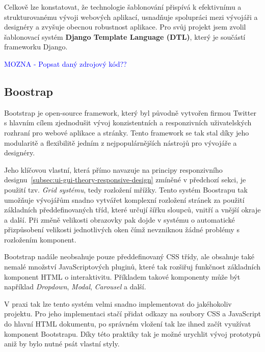 Celkově lze konstatovat, že technologie šablonování přispívá k efektivnímu a strukturovanému vývoji webových aplikací, usnadňuje spolupráci mezi vývojáři a designéry a zvyšuje obecnou robustnost aplikace. Pro svůj projekt jsem zvolil šablonovací systém \textbf{Django Template Language (DTL)}, který je součástí frameworku Django.



\textcolor{blue}{MOZNA - Popsat daný zdrojový kód??}

\subsection{Boostrap}
\label{subsec:dev-technology-bootstrap}
Bootstrap je open-source framework, který byl původně vytvořen firmou Twitter s hlavním cílem zjednodušit vývoj konzistentních a responzivních uživatelských rozhraní pro webové aplikace a stránky. Tento framework se tak stal díky jeho modularitě a flexibilitě jedním z nejpopulárnějších nástrojů pro vývojáře a designéry.

Jeho klíčovou vlastní, která přímo navazuje na principy responzivního designu~\ref{subsec:ui-gui-theory-responsive-design} zmíněné v předchozí sekci, je použití tzv. \textit{Grid systému}, tedy rozložení mřížky. Tento systém Boostrapu tak umožňuje vývojářům snadno vytvářet komplexní rozložení stránek za použití základních předdefinovaných tříd, které určují šířku sloupců, vnitří a vnější okraje a další. Při změně velikosti obrazovky pak dojde v systému o automatické přizpůsobení velikosti jednotlivých oken čímž nevzniknou žádné problémy s rozložením komponent.

Bootstrap nadále neobsahuje pouze předdefinovaný CSS třídy, ale obsahuje také nemalé množství JavaScriptových pluginů, které tak rozšiřuj funkčnost základních komponent HTML o interaktivitu. Příkladem takové komponenty může být například \textit{Dropdown}, \textit{Modal}, \textit{Carousel} a další.

V praxi tak lze tento systém velmi snadno implementovat do jakéhokoliv projektu. Pro jeho implementaci stačí přidat odkazy na soubory CSS a JavaScript do hlavní HTML dokumentu, po správném vložení tak lze ihned začít využívat komponent Bootstrapu. Díky této praktiky tak je možné urychlit vývoj prototypů aniž by bylo nutné psát vlastní styly.

\endinput